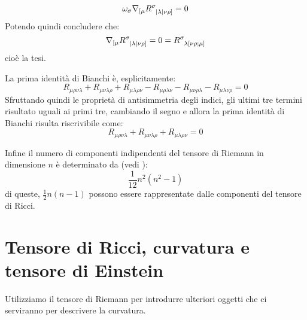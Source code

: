 \begin{enumerate}
    \begin{equation*}
        \omega_\sigma \nabla_{[\mu} \tensor{R}{^\sigma_{|\lambda|\nu\rho]}} = 0 
    \end{equation*}
    Potendo quindi concludere che:
    \begin{equation*}
        \nabla_{[\mu} \tensor{R}{^\sigma_{|\lambda|\nu\rho]}} = 0 = \tensor{R}{^\sigma_{\lambda[\nu\rho;\mu]}}
    \end{equation*}
    cioè la tesi.
\end{enumerate}

La prima identità di Bianchi è, esplicitamente:
\begin{equation*}
    R_{\mu\rho\nu\lambda} + R_{\mu\nu\lambda\rho} + R_{\mu\lambda\rho\nu} - R_{\mu\rho\lambda\nu} - R_{\mu\nu\rho\lambda} - R_{\mu\lambda\nu\rho} = 0
\end{equation*}
Sfruttando quindi le proprietà di antisimmetria degli indici, gli ultimi tre termini risultato uguali ai primi tre, cambiando il segno e allora la prima identità di Bianchi risulta riscrivibile come:
\begin{equation}
    R_{\mu\rho\nu\lambda} + R_{\mu\nu\lambda\rho} + R_{\mu\lambda\rho\nu} = 0
    \label{eq.bianchi_prima_rifatta}
\end{equation}

Infine il numero di componenti indipendenti del tensore di Riemann in dimensione $n$ è determinato da (vedi \cite{wald}):
\begin{equation*}
    \frac{1}{12}n^2(n^2-1)
\end{equation*}
di queste, $\frac{1}{2}n(n-1)$ possono essere rappresentate dalle componenti del tensore di Ricci.
\section{Tensore di Ricci, curvatura e tensore di Einstein}
Utilizziamo il tensore di Riemann per introdurre ulteriori oggetti che ci serviranno per descrivere la curvatura.

